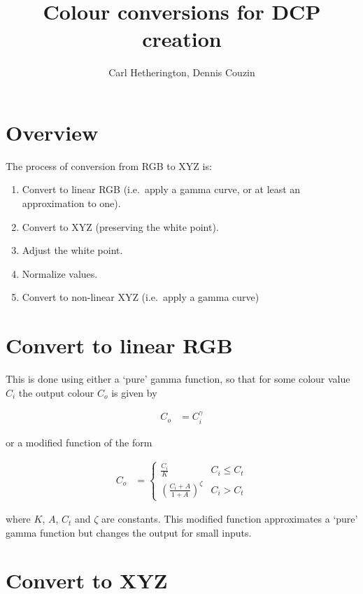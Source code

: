 \documentclass{article}
\title{Colour conversions for DCP creation}
\author{Carl Hetherington, Dennis Couzin}
\date{}
\begin{document}
\maketitle

\section{Overview}

The process of conversion from RGB to XYZ is:

\begin{enumerate}
\item Convert to linear RGB (i.e.\ apply a gamma curve, or at least an approximation to one).
\item Convert to XYZ (preserving the white point).
\item Adjust the white point.
\item Normalize values.
\item Convert to non-linear XYZ (i.e.\ apply a gamma curve)
\end{enumerate}


\section{Convert to linear RGB}

This is done using either a `pure' gamma function, so that for some colour value $C_i$ the output colour $C_o$ is given by

\begin{align*}
C_o &= C_i ^ \gamma
\end{align*}

or a modified function of the form

\begin{align*}
C_o &= \left\{
\begin{array}{ll}
\frac{C_i}{K} & C_i \leq C_t \\
\left( \frac{C_i + A}{1 + A} \right)^\zeta & C_i > C_t
\end{array}
\right.
\end{align*}

where $K$, $A$, $C_t$ and $\zeta$ are constants.  This modified function approximates a `pure' gamma function but changes the output for small inputs.


\section{Convert to XYZ}
\end{document}
